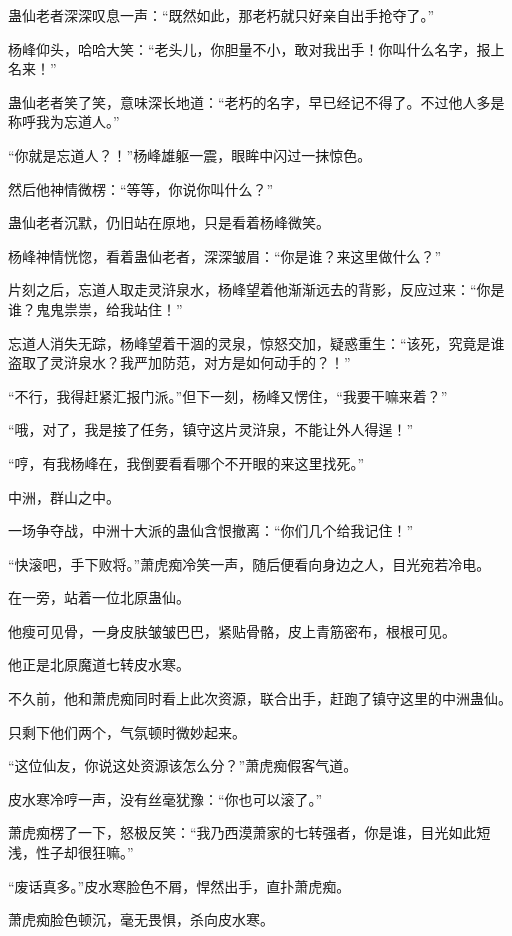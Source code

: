\begin{this_body}
蛊仙老者深深叹息一声：“既然如此，那老朽就只好亲自出手抢夺了。”

杨峰仰头，哈哈大笑：“老头儿，你胆量不小，敢对我出手！你叫什么名字，报上名来！”

蛊仙老者笑了笑，意味深长地道：“老朽的名字，早已经记不得了。不过他人多是称呼我为忘道人。”

“你就是忘道人？！”杨峰雄躯一震，眼眸中闪过一抹惊色。

然后他神情微楞：“等等，你说你叫什么？”

蛊仙老者沉默，仍旧站在原地，只是看着杨峰微笑。

杨峰神情恍惚，看着蛊仙老者，深深皱眉：“你是谁？来这里做什么？”

片刻之后，忘道人取走灵浒泉水，杨峰望着他渐渐远去的背影，反应过来：“你是谁？鬼鬼祟祟，给我站住！”

忘道人消失无踪，杨峰望着干涸的灵泉，惊怒交加，疑惑重生：“该死，究竟是谁盗取了灵浒泉水？我严加防范，对方是如何动手的？！”

“不行，我得赶紧汇报门派。”但下一刻，杨峰又愣住，“我要干嘛来着？”

“哦，对了，我是接了任务，镇守这片灵浒泉，不能让外人得逞！”

“哼，有我杨峰在，我倒要看看哪个不开眼的来这里找死。”

中洲，群山之中。

一场争夺战，中洲十大派的蛊仙含恨撤离：“你们几个给我记住！”

“快滚吧，手下败将。”萧虎痴冷笑一声，随后便看向身边之人，目光宛若冷电。

在一旁，站着一位北原蛊仙。

他瘦可见骨，一身皮肤皱皱巴巴，紧贴骨骼，皮上青筋密布，根根可见。

他正是北原魔道七转皮水寒。

不久前，他和萧虎痴同时看上此次资源，联合出手，赶跑了镇守这里的中洲蛊仙。

只剩下他们两个，气氛顿时微妙起来。

“这位仙友，你说这处资源该怎么分？”萧虎痴假客气道。

皮水寒冷哼一声，没有丝毫犹豫：“你也可以滚了。”

萧虎痴楞了一下，怒极反笑：“我乃西漠萧家的七转强者，你是谁，目光如此短浅，性子却很狂嘛。”

“废话真多。”皮水寒脸色不屑，悍然出手，直扑萧虎痴。

萧虎痴脸色顿沉，毫无畏惧，杀向皮水寒。


\end{this_body}
